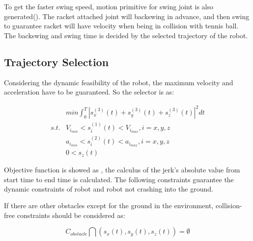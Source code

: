 \documentclass{jarticle}
\begin{document}
To get the faster swing speed, motion primitive for swing joint is also generated(). The racket attached joint will backswing in advance, and then swing to guarantee racket will have velocity when being in collision with tennis ball. The backswing and swing time is decided by the selected trajectory of the robot.

\subsection{Trajectory Selection}
Considering the dynamic feasibility of the robot, the maximum velocity and acceleration have to be guaranteed. So the selector is as:

\begin{eqnarray}
  \label{eq:temp3}
 & min{\int_0^T |s^{(3)}_x(t) + s^{(3)}_y(t) + s^{(3)}_z(t)|^2 dt}   \\
  \label{eq:temp4}
s.t. &  V_{i_{min}} < s^{(1)}_i(t) < V_{i_{max}}, i = x, y, z \nonumber \\
  \label{eq:temp5}
 & a_{i_{min}} < s^{(2)}_i(t) < a_{i_{max}}, i = x, y, z \nonumber \\
  \label{eq:temp6}
 & 0 < s_z(t) \nonumber
\end{eqnarray}

Objective function is showed as , the calculus of the jerk’s absolute value from start time to end time is calculated. The following constraints guarantee the dynamic constraints of robot and robot not crashing into the ground.

If there are other obstacles except for the ground in the environment, collision-free constraints should be considered as:

\begin{equation}
  \label{eq:temp7}
  C_{obstacle}\bigcap (s_x(t), s_y(t), s_z(t)) =\emptyset
\end{equation}
\end{document}
